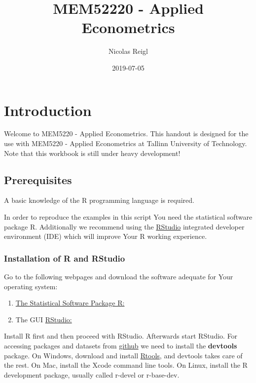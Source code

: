 \documentclass[]{book}
\title{MEM52220 - Applied Econometrics}
\author{Nicolas Reigl}
\date{2019-07-05}
\providecommand{\tightlist}{%
  \setlength{\itemsep}{0pt}\setlength{\parskip}{0pt}}
\begin{document}
\maketitle

{
\setcounter{tocdepth}{1}
\tableofcontents
}
\hypertarget{introduction}{%
\chapter*{Introduction}\label{introduction}}

Welcome to MEM5220 - Applied Econometrics. This handout is designed for the use with MEM5220 - Applied Econometrics at Tallinn University of Technology. Note that this workbook is still under heavy development!

\hypertarget{prerequisites}{%
\section*{Prerequisites}\label{prerequisites}}

A basic knowledge of the R \citep{team2013r} programming language is required.

In order to reproduce the examples in this script You need the statistical software package R. Additionally we recommend using the \href{https://www.rstudio.com}{RStudio} integrated developer environment (IDE) which will improve Your R working experience.

\hypertarget{installation-of-r-and-rstudio}{%
\subsection*{Installation of R and RStudio}\label{installation-of-r-and-rstudio}}

Go to the following webpages and download the software adequate for Your operating system:

\begin{enumerate}
\def\labelenumi{\arabic{enumi}.}
\tightlist
\item
  \href{http://cran.r-project.org}{The Statistical Software Package R:}
\item
  The GUI \href{https://www.rstudio.com}{RStudio:}
\end{enumerate}

Install R first and then proceed with RStudio. Afterwards start RStudio. For accessing packages and datasets from \href{https://github.com/}{github} we need to install the \textbf{devtools} package. On Windows, download and install \href{https://cran.r-project.org/bin/windows/Rtools/}{Rtools}, and devtools takes care of the rest. On Mac, install the Xcode command line tools. On Linux, install the R development package, usually called r-devel or r-base-dev.
\end{document}
